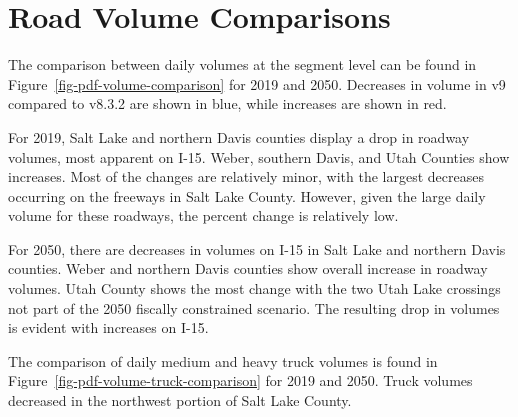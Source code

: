 \documentclass[
  letterpaper,
  DIV=11,
  numbers=noendperiod]{scrreprt}
\begin{document}
\hypertarget{road-volume-comparisons}{%
\section{Road Volume Comparisons}\label{road-volume-comparisons}}

The comparison between daily volumes at the segment level can be found
in Figure~\ref{fig-pdf-volume-comparison} for 2019 and 2050. Decreases
in volume in v9 compared to v8.3.2 are shown in blue, while increases
are shown in red.

For 2019, Salt Lake and northern Davis counties display a drop in
roadway volumes, most apparent on I-15. Weber, southern Davis, and Utah
Counties show increases. Most of the changes are relatively minor, with
the largest decreases occurring on the freeways in Salt Lake County.
However, given the large daily volume for these roadways, the percent
change is relatively low.

For 2050, there are decreases in volumes on I-15 in Salt Lake and
northern Davis counties. Weber and northern Davis counties show overall
increase in roadway volumes. Utah County shows the most change with the
two Utah Lake crossings not part of the 2050 fiscally constrained
scenario. The resulting drop in volumes is evident with increases on
I-15.

The comparison of daily medium and heavy truck volumes is found in
Figure~\ref{fig-pdf-volume-truck-comparison} for 2019 and 2050. Truck
volumes decreased in the northwest portion of Salt Lake County.
\end{document}
